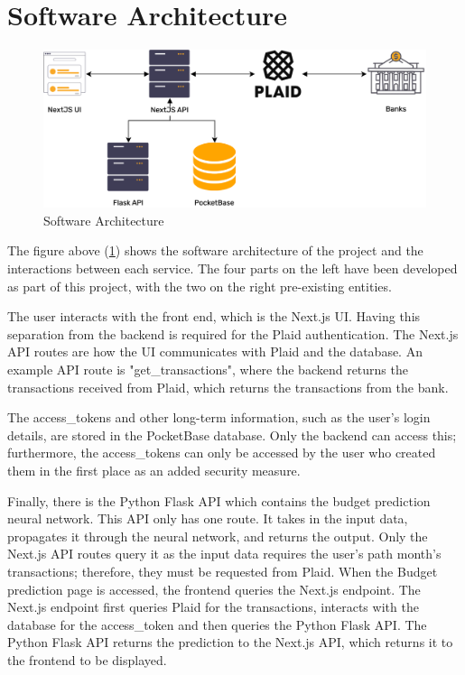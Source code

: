 \section{Software Architecture}

\begin{figure}[H]
	\centering
	\includegraphics[width=\textwidth]{images/Architecture.drawio.png}
	\caption{Software Architecture}
	\label{fig:SoftwareArchitecture}
\end{figure}

The figure above (\ref{fig:SoftwareArchitecture}) shows the software architecture of the project and the interactions between each service. The four parts on the left have been developed as part of this project, with the two on the right pre-existing entities. 

The user interacts with the front end, which is the Next.js UI. Having this separation from the backend is required for the Plaid authentication. The Next.js API routes are how the UI communicates with Plaid and the database. An example API route is "get\_transactions", where the backend returns the transactions received from Plaid, which returns the transactions from the bank.

The access\_tokens and other long-term information, such as the user's login details, are stored in the PocketBase database. Only the backend can access this; furthermore, the access\_tokens can only be accessed by the user who created them in the first place as an added security measure. 

Finally, there is the Python Flask API which contains the budget prediction neural network. This API only has one route. It takes in the input data, propagates it through the neural network, and returns the output. Only the Next.js API routes query it as the input data requires the user's path month's transactions; therefore, they must be requested from Plaid. When the Budget prediction page is accessed, the frontend queries the Next.js endpoint. The Next.js endpoint first queries Plaid for the transactions, interacts with the database for the access\_token and then queries the Python Flask API. The Python Flask API returns the prediction to the Next.js API, which returns it to the frontend to be displayed.

